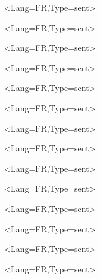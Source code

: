 \documentclass[a5paper,11pt]{article}
\begin{document}
\begin{EnvtExo}%
	\ipsum<Lang=FR,Type=sent>
\end{EnvtExo}

\begin{EnvtExo}[Trait=pointilles]%
	\ipsum<Lang=FR,Type=sent>
\end{EnvtExo}

\begin{EnvtExo}[Trait=dashilles]%
	\ipsum<Lang=FR,Type=sent>
\end{EnvtExo}

\begin{EnvtExo}[Decoration=Icone/\faPython]%
	\ipsum<Lang=FR,Type=sent>
\end{EnvtExo}

\begin{EnvtExo}[Decoration=Ceinture/rouge]%
	\ipsum<Lang=FR,Type=sent>
\end{EnvtExo}

\begin{EnvtExo}[Decoration=Chrono/20]%
	\ipsum<Lang=FR,Type=sent>
\end{EnvtExo}

\begin{EnvtExo}[Decoration=Image/goku_ssj4]%
	\ipsum<Lang=FR,Type=sent>
\end{EnvtExo}

\begin{EnvtExo}[Decoration=Image/sseiya_shura]%
	\ipsum<Lang=FR,Type=sent>
\end{EnvtExo}

\begin{EnvtExo}[Decoration=Points/7]%
	\ipsum<Lang=FR,Type=sent>
\end{EnvtExo}

\begin{EnvtExo}[Type=Perso/{Titre perso }]%
	\ipsum<Lang=FR,Type=sent>
\end{EnvtExo}

\StyleEnvtExo[Couleur=red,Police=\bfseries\ttfamily,EpTrait=2pt,Libelle={Exercice n°}]

\begin{EnvtExo}[Decoration=Icone/\faAddressBook]%
	\ipsum<Lang=FR,Type=sent>
\end{EnvtExo}

\begin{EnvtExo}[Type=Perso/{Titre perso },Decoration=Chrono/25,Couleur=red,Trait=dashilles]%
	\ipsum<Lang=FR,Type=sent>
\end{EnvtExo}

\StyleEnvtExoDefaut

\begin{EnvtExo}%
	[Type=Perso/{Titre perso~},Decoration=Image/goku_ssj4,Trait=non,Compteur=false]%
	\ipsum<Lang=FR,Type=sent>
\end{EnvtExo}

\TitreExo[Type=Perso/{Annexe Exercice 3},Compteur=false,Decoration=Image/sseiya_aiolos]%

\ipsum<Lang=FR,Type=sent>
\end{document}
